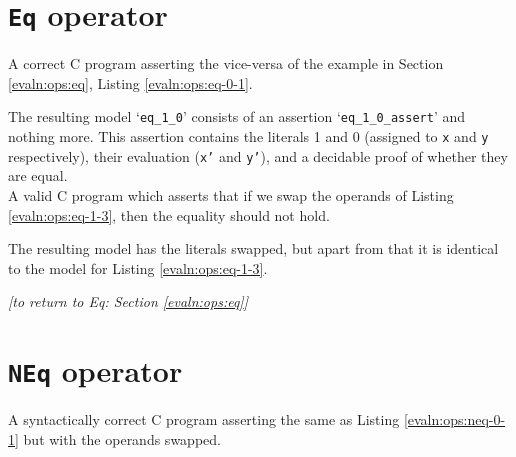 \section{\texttt{Eq} operator}\label{app:evaln:ops:eq}
    
    
    A correct C program asserting the vice-versa of the example in Section \ref{evaln:ops:eq}, Listing \ref{evaln:ops:eq-0-1}.
    
    The resulting model `\texttt{eq\_1\_0}' consists of an assertion `\texttt{eq\_1\_0\_assert}' and nothing more. This assertion contains the literals 1 and 0 (assigned to \texttt{x} and \texttt{y} respectively), their evaluation (\texttt{x'} and \texttt{y'}), and a decidable proof of whether they are equal.
    \\
    
    
    
    A valid C program which asserts that if we swap the operands of Listing \ref{evaln:ops:eq-1-3}, then the equality should not hold.
    
    
    The resulting model has the literals swapped, but apart from that it is identical to the model for Listing \ref{evaln:ops:eq-1-3}.
    \\
    
    \begin{flushright}
        \textit{[to return to Eq: Section \ref{evaln:ops:eq}]}
    \end{flushright}

\newpage


\section{\texttt{NEq} operator}\label{app:evaln:ops:neq}
    
    
    A syntactically correct C program asserting the same as Listing \ref{evaln:ops:neq-0-1} but with the operands swapped.
    
    
